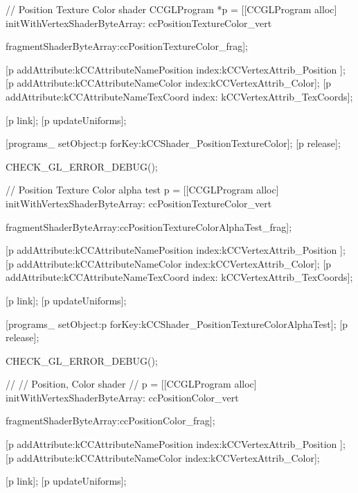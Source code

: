 \begin{DoxyCode}
{
        // Position Texture Color shader
        CCGLProgram *p = [[CCGLProgram alloc] initWithVertexShaderByteArray:
      ccPositionTextureColor_vert
                                                                                                
      fragmentShaderByteArray:ccPositionTextureColor_frag];

        [p addAttribute:kCCAttributeNamePosition index:kCCVertexAttrib_Position
      ];
        [p addAttribute:kCCAttributeNameColor index:kCCVertexAttrib_Color];
        [p addAttribute:kCCAttributeNameTexCoord index:
      kCCVertexAttrib_TexCoords];

        [p link];
        [p updateUniforms];

        [programs_ setObject:p forKey:kCCShader_PositionTextureColor];
        [p release];

        CHECK_GL_ERROR_DEBUG();

        // Position Texture Color alpha test
        p = [[CCGLProgram alloc] initWithVertexShaderByteArray:
      ccPositionTextureColor_vert
                                                                   
      fragmentShaderByteArray:ccPositionTextureColorAlphaTest_frag];

        [p addAttribute:kCCAttributeNamePosition index:kCCVertexAttrib_Position
      ];
        [p addAttribute:kCCAttributeNameColor index:kCCVertexAttrib_Color];
        [p addAttribute:kCCAttributeNameTexCoord index:
      kCCVertexAttrib_TexCoords];

        [p link];
        [p updateUniforms];

        [programs_ setObject:p forKey:kCCShader_PositionTextureColorAlphaTest];
        [p release];

        CHECK_GL_ERROR_DEBUG();

        //
        // Position, Color shader
        //
        p = [[CCGLProgram alloc] initWithVertexShaderByteArray:
      ccPositionColor_vert
                                                                   
      fragmentShaderByteArray:ccPositionColor_frag];

        [p addAttribute:kCCAttributeNamePosition index:kCCVertexAttrib_Position
      ];
        [p addAttribute:kCCAttributeNameColor index:kCCVertexAttrib_Color];

        [p link];
        [p updateUniforms];

}
\end{DoxyCode}
